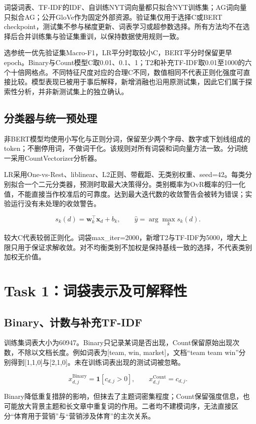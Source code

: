 \documentclass[UTF8,a4paper,11pt,fontset=fandol]{ctexart}
\begin{document}
词袋词表、TF-IDF的IDF、自训练NYT词向量都只拟合NYT训练集；AG词向量只拟合AG；公开GloVe作为固定外部资源。验证集仅用于选择C或BERT checkpoint，测试集不参与梯度更新、词表学习或超参数选择。所有方法均不在选择后合并训练集与验证集重训，以保持数据使用规则一致。

选参统一优先验证集Macro-F1，LR平分时取较小C，BERT平分时保留更早epoch。Binary与Count模型C取0.01、0.1、1；T2和补充TF-IDF取0.01至1000的六个十倍网格点。不同特征尺度对应的合理C不同，数值相同不代表正则化强度可直接比较。模型表现已被用于事后解释，新增消融也沿用原测试集，因此它们属于探索性分析，并非新测试集上的独立确认。

\subsection{分类器与统一预处理}
非BERT模型均使用小写化与正则分词，保留至少两个字母、数字或下划线组成的token；不删停用词，不做词干化。该规则对所有词袋和词向量方法一致。分词统一采用CountVectorizer分析器。

LR采用One-vs-Rest、liblinear、L2正则、带截距、无类别权重、seed=42。每类分别拟合一个二元分类器，预测时取最大决策得分。类别概率为OvR概率的归一化值，不能直接当作校准后的可靠度。达到最大迭代数的收敛警告会被转为错误；实验运行没有未处理的收敛警告。

\[
s_k(d)=\boldsymbol w_k^\top\boldsymbol x_d+b_k,\qquad
\hat y=\arg\max_k s_k(d).
\]

较大C代表较弱正则化。词袋max\_\allowbreak{}iter=2000，新增T2与TF-IDF为5000，增大上限只用于保证求解收敛。对不均衡类别不加权是保持基线一致的选择，不代表类别加权无价值。

\section{Task 1：词袋表示及可解释性}
\subsection{Binary、计数与补充TF-IDF}
训练集词表大小为60947。Binary只记录某词是否出现，Count保留原始出现次数，不除以文档长度。例如词表为[team, win, market]，文档“team team win”分别得到[1,1,0]与[2,1,0]。未在训练词表出现的测试词被忽略。

\[
x_{d,j}^{\mathrm{Binary}}=\mathbf{1}[c_{d,j}>0],\qquad
x_{d,j}^{\mathrm{Count}}=c_{d,j}.
\]

Binary降低重复措辞的影响，但抹去了主题词密集程度；Count保留强度信息，也可能放大背景主题和长文章中重复词的作用。二者均不建模词序，无法直接区分“体育用于营销”与“营销涉及体育”的主次关系。
\end{document}
